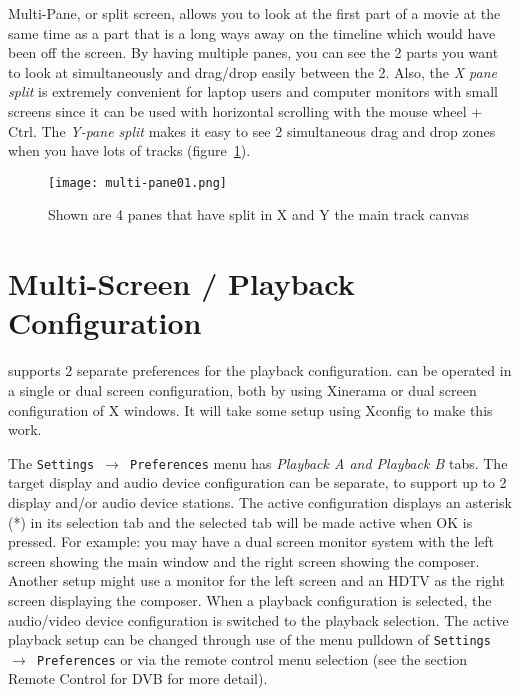 Multi-Pane, or split screen, allows you to look at the first part of a movie at the same time as a part that is a long ways away on the timeline which would have been off the screen.  By having multiple panes, you can see the 2 parts you want to look at simultaneously and drag/drop easily between the 2.  Also, the \textit{X pane split} is extremely convenient for laptop users and computer monitors with small screens since it can be used with horizontal scrolling with the mouse wheel + Ctrl.  The \textit{Y-pane split} makes it easy to see 2 simultaneous drag and drop zones when you have lots of tracks (figure~\ref{fig:multi-pane01}).

\begin{figure}[htpb]
    \centering
    \texttt{[image: multi-pane01.png]}
    \caption{Shown are 4 panes that have split in X and Y the main track canvas}
    \label{fig:multi-pane01}
\end{figure}

\section{Multi-Screen / Playback Configuration}%
\label{sec:multiscreen_playback_configuration}

\CGG{} supports 2 separate preferences for the playback configuration.  \CGG{} can be operated in a single or dual screen configuration, both by using Xinerama or dual screen configuration of X windows.  It will take some setup using Xconfig to make this work.

The \texttt{Settings $\rightarrow$ Preferences} menu has \textit{Playback A and Playback B} tabs.  The target display and audio device configuration can be separate, to support up to 2 display and/or audio device stations.  The active configuration displays an asterisk (*) in its selection tab and the selected tab will be made active when OK is pressed.  For example: you may have a dual screen monitor system with the left screen showing the \CGG{} main window and the right screen showing the composer.  Another setup might use a monitor for the left screen and an HDTV as the right screen displaying the composer.  When a playback configuration is selected, the audio/video device configuration is switched to the playback selection.  The active playback setup can be changed through use of the menu pulldown of \texttt{Settings $\rightarrow$ Preferences} or via the remote control menu selection (see the section Remote Control for DVB for more detail). 

